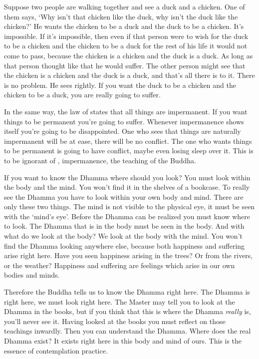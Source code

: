 Suppose two people are walking together and see a duck and a chicken. One of them says, `Why isn't that chicken like the duck, why isn't the duck like the chicken?' He wants the chicken to be a duck and the duck to be a chicken. It's impossible. If it's impossible, then even if that person were to wish for the duck to be a chicken and the chicken to be a duck for the rest of his life it would not come to pass, because the chicken is a chicken and the duck is a duck. As long as that person thought like that he would suffer. The other person might see that the chicken is a chicken and the duck is a duck, and that's all there is to it. There is no problem. He sees rightly. If you want the duck to be a chicken and the chicken to be a duck, you are really going to suffer. 

In the same way, the law of  states that all things are impermanent. If you want things to be permanent you're going to suffer. Whenever impermanence shows itself you're going to be disappointed. One who sees that things are naturally impermanent will be at ease, there will be no conflict. The one who wants things to be permanent is going to have conflict, maybe even losing sleep over it. This is to be ignorant of , impermanence, the teaching of the Buddha. 

If you want to know the Dhamma where should you look? You must look within the body and the mind. You won't find it in the shelves of a bookcase. To really see the Dhamma you have to look within your own body and mind. There are only these two things. The mind is not visible to the physical eye, it must be seen with the `mind's eye'. Before the Dhamma can be realized you must know where to look. The Dhamma that is in the body must be seen in the body. And with what do we look at the body? We look at the body with the mind. You won't find the Dhamma looking anywhere else, because both happiness and suffering arise right here. Have you seen happiness arising in the trees? Or from the rivers, or the weather? Happiness and suffering are feelings which arise in our own bodies and minds. 

Therefore the Buddha tells us to know the Dhamma right here. The Dhamma is right here, we must look right here. The Master may tell you to look at the Dhamma in the books, but if you think that this is where the Dhamma \textit{really} is, you'll never see it. Having looked at the books you must reflect on those teachings inwardly. Then you can understand the Dhamma. Where does the real Dhamma exist? It exists right here in this body and mind of ours. This is the essence of contemplation practice. 

